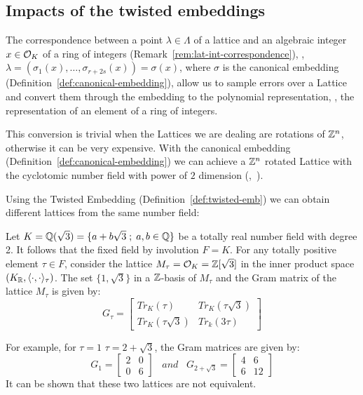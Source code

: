 \documentclass[a4paper,12pt]{article}
\begin{document}
\subsection{Impacts of the twisted embeddings}
\label{sec:orgfc6c889}

\begin{text}
  The correspondence between a point $\lambda \in \Lambda$ of a lattice and an algebraic
  integer $x \in \mathcal{O}_K$ of a ring of integers (Remark~\ref{rem:lat-int-correspondence}),
  \ie, $\lambda = (\sigma_1(x), \dots, \sigma_{r+2s}(x)) = \sigma(x)$, where $\sigma$ is the
  canonical embedding (Definition~\ref{def:canonical-embedding}), allow us to
  sample errors over a Lattice and convert them through the embedding to the
  polynomial representation, \ie, the representation of an element of a ring of
  integers.

  This conversion is trivial when the Lattices we are dealing are rotations of
  $\mathbb{Z}^n$, otherwise it can be very expensive. With the canonical embedding
  (Definition~\ref{def:canonical-embedding}) we can achieve a $\mathbb{Z}^n$ rotated
  Lattice with the cyclotomic number field with power of $2$ dimension
  (\cite{Lyubashevsky2010},~\cite{DucasDurmos2012}).

  Using the Twisted Embedding (Definition~\ref{def:twisted-emb}) we can obtain
  different lattices from the same number field:

\end{text}

   \begin{example}
  Let $K = \mathbb{Q}(\sqrt{3}) = \{a + b\sqrt{3} \;;\; a,b \in \mathbb{Q}\}$ be a totally
  real number field with degree 2. It follows that the fixed field by
  involution $F=K$. For any totally positive element $\tau \in F$, consider
  the lattice $M_\tau = \mathcal{O}_K = \mathbb{Z}[\sqrt{3}]$ in the inner product space
  $(K_{\mathbb{R}},\langle \cdot,\cdot \rangle_\tau)$. The set $\{1,\sqrt{3}\}$ in a
  $\mathbb{Z}$-basis of $M_\tau$ and the Gram matrix of the lattice $M_\tau$ is given by:
  \[G_\tau =
    \begin{bmatrix}
      Tr_K(\tau) & Tr_K(\tau\sqrt{3}) \\
      Tr_K(\tau\sqrt{3}) & Tr_k(3\tau)
    \end{bmatrix}
  \]

  For example, for $\tau = 1$  $\tau = 2 + \sqrt{3}$, the Gram matrices are
  given by:
  \[
    G_1 =
    \begin{bmatrix}
      2 & 0 \\
      0 & 6
    \end{bmatrix}
    \;\;\;and\;\;\;
    G_{2+\sqrt{3}} =
    \begin{bmatrix}
      4 & 6 \\
      6 & 12
    \end{bmatrix}
  \]
  It can be shown that these two lattices are not equivalent.
\end{example}
\end{document}
